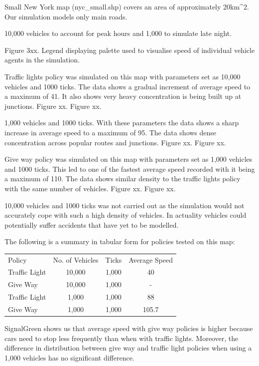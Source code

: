 \documentclass[11pt]{article}
\begin{document}
\begin{enumerate}
Small New York map (nyc_small.shp) covers an area of approximately 20km^2. Our simulation models only main roads. 

10,000 vehicles to account for peak hours and 1,000 to simulate late night.


Figure 3xx. Legend displaying palette used to visualise speed of individual vehicle agents in the simulation.

Traffic lights policy was simulated on this map with parameters set as 10,000 vehicles and 1000 ticks. The data shows a gradual increment of average speed to a maximum of 41. It also shows very heavy concentration is being built up at junctions.
Figure xx.
Figure xx.

1,000 vehicles and 1000 ticks. With these parameters the data shows a sharp increase in average speed to a maximum of 95. The data shows dense concentration across popular routes and junctions.
Figure xx.
Figure xx.

Give way policy was simulated on this map with parameters set as 1,000 vehicles and 1000 ticks. This led to one of the fastest average speed recorded with it being a maximum of 110. The data shows similar density to the traffic lights policy with the same number of vehicles.
Figure xx.
Figure xx.

10,000 vehicles and 1000 ticks was not carried out as the simulation would not accurately cope with such a high density of vehicles. In actuality vehicles could potentially suffer accidents that have yet to be modelled. 

The following is a summary in tabular form for policies tested on this map:


\begin{center}
\begin{tabular}{ l | c | c | c }
\hline
Policy & No. of Vehicles & Ticks & Average Speed \\
Traffic Light & 10,000 & 1,000 & 40 \\
Give Way & 10,000 & 1,000 & - \\
Traffic Light & 1,000 & 1,000 & 88 \\
Give Way & 1,000 & 1,000 & 105.7 \\
\hline
\end{tabular}
\end{center}

SignalGreen shows us that average speed with give way policies is higher because cars need to stop less frequently than when with traffic lights. Moreover, the difference in distribution between give way and traffic light policies when using a 1,000 vehicles has no significant difference.


\end{enumerate}
\end{document}
